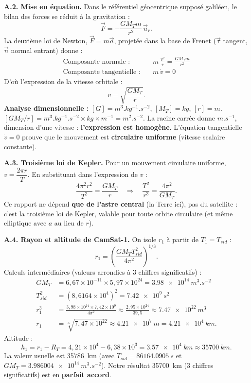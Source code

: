 \documentclass[11pt]{article}
\begin{document}
\begin{exoresolu}
\textbf{A.2. Mise en équation.} Dans le référentiel géocentrique supposé galiléen, le bilan des forces se réduit à la gravitation :
\[
\vec{F} = -\frac{G M_T m}{r^2}\,\vec{u}_r.
\]
La deuxième loi de Newton, $\vec{F} = m\vec{a}$, projetée dans la base de Frenet ($\vec{\tau}$ tangent, $\vec{n}$ normal entrant) donne :
\begin{align*}
\text{Composante normale :}\quad & m\,\frac{v^2}{r} = \frac{G M_T m}{r^2} \\
\text{Composante tangentielle :}\quad & m\,\dot{v} = 0
\end{align*}
D'où l'expression de la vitesse orbitale :
\[
\boxed{v = \sqrt{\frac{G M_T}{r}}}.
\]
\textbf{Analyse dimensionnelle :} $[G] = \si{m^3.kg^{-1}.s^{-2}}$, $[M_T] = \si{kg}$, $[r] = \si{m}$.
$[GM_T/r] = \si{m^3.kg^{-1}.s^{-2}} \times \si{kg} \times \si{m^{-1}} = \si{m^2.s^{-2}}$.
La racine carrée donne $\si{m.s^{-1}}$, dimension d'une vitesse : \textbf{l'expression est homogène}.
L'équation tangentielle $\dot{v}=0$ prouve que le mouvement est \textbf{circulaire uniforme} (vitesse scalaire constante).

\textbf{A.3. Troisième loi de Kepler.} Pour un mouvement circulaire uniforme, $v = \dfrac{2\pi r}{T}$. En substituant dans l'expression de $v$ :
\[
\frac{4\pi^2 r^2}{T^2} = \frac{G M_T}{r}
\quad\Longrightarrow\quad
\boxed{\frac{T^2}{r^3} = \frac{4\pi^2}{G M_T}}.
\]
Ce rapport ne dépend \textbf{que de l'astre central} (la Terre ici), pas du satellite : c'est la troisième loi de Kepler, valable pour toute orbite circulaire (et même elliptique avec $a$ au lieu de $r$).

\textbf{A.4. Rayon et altitude de CamSat-1.} On isole $r_1$ à partir de $T_1 = T_{sid}$ :
\[
r_1 = \left(\frac{G M_T T_{sid}^2}{4\pi^2}\right)^{1/3}.
\]
Calculs intermédiaires (valeurs arrondies à 3 chiffres significatifs) :
\begin{align*}
G M_T &= 6,67\times 10^{-11} \times 5,97\times 10^{24} = \SI{3,98e14}{m^3.s^{-2}} \\
T_{sid}^2 &= (8,6164\times 10^{4})^2 = \SI{7,42e9}{s^2} \\
r_1^3 &= \frac{3,98\times 10^{14} \times 7,42\times 10^{9}}{4\pi^2} \approx \frac{2,95\times 10^{24}}{39,5} \approx \SI{7,47e22}{m^3} \\
r_1 &= \sqrt[3]{7,47\times 10^{22}} \approx \SI{4,21e7}{m} = \SI{4,21e4}{km}.
\end{align*}
Altitude :
\[
h_1 = r_1 - R_T = 4,21\times 10^{4} - 6,38\times 10^{3} = \SI{3,57e4}{km} \approx \SI{35700}{km}.
\]
La valeur usuelle est \SI{35786}{km} (avec $T_{sid} = \SI{86164,0905}{s}$ et $GM_T = \SI{3,986004e14}{m^3.s^{-2}}$). Notre résultat \SI{35700}{km} (3 chiffres significatifs) est en \textbf{parfait accord}.


\end{exoresolu}
\end{document}
